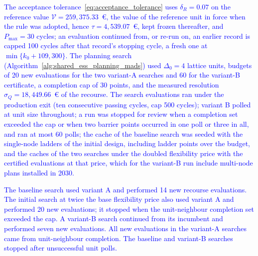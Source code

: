 \documentclass[preprint,12pt]{elsarticle}
\begin{document}
\textcolor{blue}{
    The acceptance tolerance~\eqref{eq:acceptance_tolerance} uses $\delta_R = 0.07$ on the reference value $\mathcal{V} = 259{,}375.33$~\euro{}, the value of the reference unit in force when the rule was adopted, hence $\tau = 4{,}539.07$~\euro{}, kept frozen thereafter, and $P_{\max} = 30$ cycles;
    an evaluation continued from, or re-run on, an earlier record is capped 100 cycles after that record's stopping cycle, a fresh one at $\min\{k_0 + 109, 300\}$. The planning search (Algorithm~\ref{alg:shared_ess_planning_mads}) used $\Delta_0 = 4$ lattice units, budgets of 20 new evaluations for the two variant-A searches and 60 for the variant-B certificate, a completion cap of 30 points, and the measured resolution $\sigma_Q = 18{,}449.66$~\euro{} of the recourse.
    The search evaluations ran under the production exit (ten consecutive passing cycles, cap 500 cycles); variant B polled at unit size throughout; a run was stopped for review when a completion set exceeded the cap or when two barrier points occurred in one poll or three in all, and ran at most 60 polls; the cache of the baseline search was seeded with the single-node ladders of the initial design, including ladder points over the budget, and the caches of the two searches under the doubled flexibility price with the certified evaluations at that price, which for the variant-B run include multi-node plans installed in 2030.
}

\textcolor{blue}{
    The baseline search used variant A and performed 14 new recourse evaluations. The initial search at twice the base flexibility price also used variant A and performed 20 new evaluations; it stopped when the unit-neighbour completion set exceeded the cap. A variant-B search continued from its incumbent and performed seven new evaluations. All new evaluations in the variant-A searches came from unit-neighbour completion. The baseline and variant-B searches stopped after unsuccessful unit polls.
}
\end{document}
